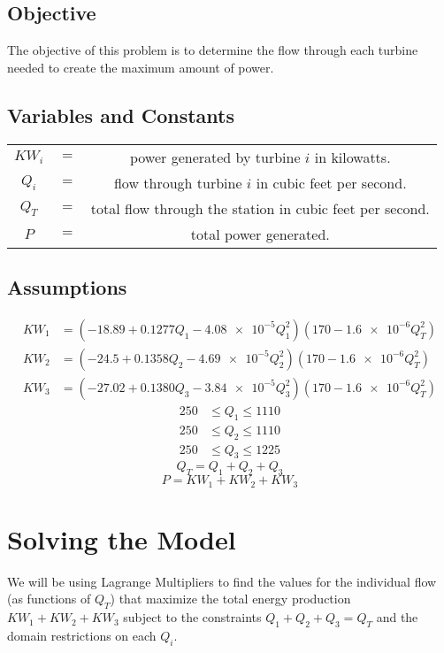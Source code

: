 \documentclass{report}
\begin{document}
\subsection{Objective}
\hspace{10mm} The objective of this problem is to determine the flow through each turbine needed to create the maximum amount of power.
\subsection{Variables and Constants}

\begin{center}
\begin{tabular}{c c c}
$KW_i$ &$=$ & power generated by turbine $i$ in kilowatts.\\
$Q_i$ & $=$ & flow through turbine $i$ in cubic feet per second.\\
$Q_T$ & $=$ & total flow through the station in cubic feet per second.\\
$P$ & $=$ & total power generated.

\end{tabular}
\end{center}


\subsection{Assumptions}
\begin{align*}
    KW_1 &= (-18.89+0.1277Q_1-\num{4.08e-5}Q_1^2)(170-\num{1.6e-6}Q_T^2)\\
    KW_2 &= (-24.5+0.1358Q_2-\num{4.69e-5}Q_2^2)(170-\num{1.6e-6}Q_T^2)\\
    KW_3 &= (-27.02+0.1380Q_3-\num{3.84e-5}Q_3^2)(170-\num{1.6e-6}Q_T^2)
\end{align*}
\begin{align*}
    250 &\leq Q_1 \leq 1110\\
    250 &\leq Q_2 \leq 1110\\
    250 &\leq Q_3 \leq 1225
\end{align*}
$$Q_T=Q_1+Q_2+Q_3$$
$$P = KW_1+KW_2+KW_3$$

\section{Solving the Model}
We will be using Lagrange Multipliers to find the values for the individual flow (as functions of $Q_T$) that maximize the total energy production $KW_1+KW_2+KW_3$ subject to the constraints $Q_1+Q_2+Q_3=Q_T$ and the domain restrictions on each $Q_i$.
\end{document}
